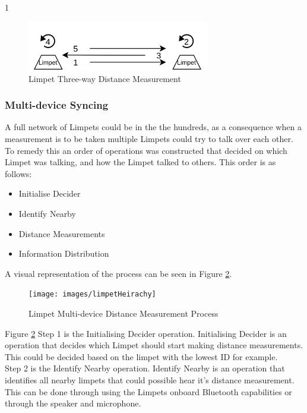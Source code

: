 1\documentclass{article}
\begin{document}
\begin{figure}[H]
	\centering
	\noindent\includegraphics[width=0.71\textwidth]{images/limpetThreeway}
	\caption{Limpet Three-way Distance Measurement}
	\label{fig:limpetThreeway}
\end{figure}

\subsubsection{Multi-device Syncing}
A full network of Limpets could be in the the hundreds, as a consequence when a measurement is to be taken multiple Limpets could try to talk over each other. To remedy this an order of operations was constructed that decided on which Limpet was talking, and how the Limpet talked to others. This order is as follows:

\begin{itemize}
\item Initialise Decider
\item Identify Nearby
\item Distance Measurements
\item Information Distribution
\end{itemize}

A visual representation of the process can be seen in Figure \ref{fig:limpetHeirachy}.

\begin{figure}[H]
	\centering
	\noindent\texttt{[image: images/limpetHeirachy]}
	\caption{Limpet Multi-device Distance Measurement Process}
	\label{fig:limpetHeirachy}
\end{figure}

Figure \ref{fig:limpetHeirachy} Step 1 is the Initialising Decider operation. Initialising Decider is an operation that decides which Limpet should start making distance measurements. This could be decided based on the limpet with the lowest ID for example.\\

Step 2 is the Identify Nearby operation. Identify Nearby is an operation that identifies all nearby limpets that could possible hear it's distance measurement. This can be done through using the Limpets onboard Bluetooth capabilities or through the speaker and microphone.\\
\end{document}
